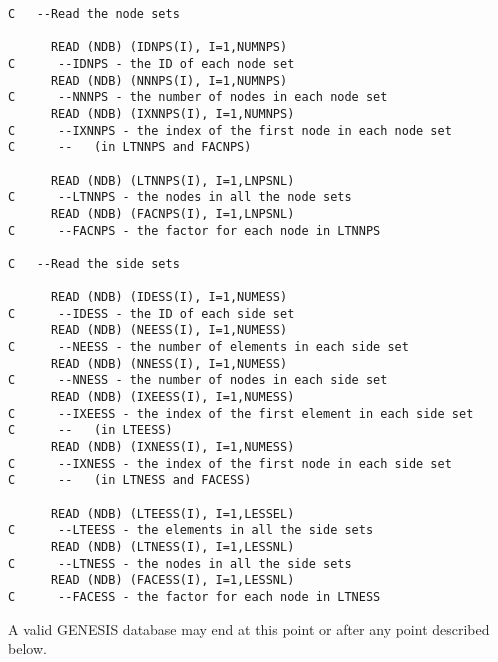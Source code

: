 \newpage
\begin{verbatim}
C   --Read the node sets

      READ (NDB) (IDNPS(I), I=1,NUMNPS)
C      --IDNPS - the ID of each node set
      READ (NDB) (NNNPS(I), I=1,NUMNPS)
C      --NNNPS - the number of nodes in each node set
      READ (NDB) (IXNNPS(I), I=1,NUMNPS)
C      --IXNNPS - the index of the first node in each node set
C      --   (in LTNNPS and FACNPS)

      READ (NDB) (LTNNPS(I), I=1,LNPSNL)
C      --LTNNPS - the nodes in all the node sets
      READ (NDB) (FACNPS(I), I=1,LNPSNL)
C      --FACNPS - the factor for each node in LTNNPS

C   --Read the side sets

      READ (NDB) (IDESS(I), I=1,NUMESS)
C      --IDESS - the ID of each side set
      READ (NDB) (NEESS(I), I=1,NUMESS)
C      --NEESS - the number of elements in each side set
      READ (NDB) (NNESS(I), I=1,NUMESS)
C      --NNESS - the number of nodes in each side set
      READ (NDB) (IXEESS(I), I=1,NUMESS)
C      --IXEESS - the index of the first element in each side set
C      --   (in LTEESS)
      READ (NDB) (IXNESS(I), I=1,NUMESS)
C      --IXNESS - the index of the first node in each side set
C      --   (in LTNESS and FACESS)

      READ (NDB) (LTEESS(I), I=1,LESSEL)
C      --LTEESS - the elements in all the side sets
      READ (NDB) (LTNESS(I), I=1,LESSNL)
C      --LTNESS - the nodes in all the side sets
      READ (NDB) (FACESS(I), I=1,LESSNL)
C      --FACESS - the factor for each node in LTNESS
\end{verbatim}
\newpage

A valid GENESIS database may end at this point or after any point
described below.

